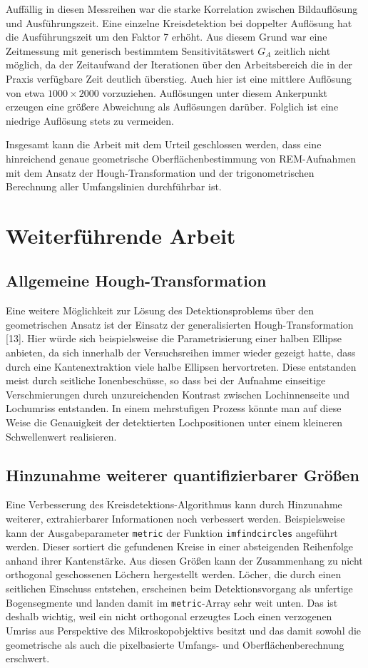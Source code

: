 \documentclass[accentcolor=tud1c, 11pt, toc=bib, toc=listof, captions=abovetable, parskip=half]{tudreport}
\begin{document}
Auffällig in diesen Messreihen war die starke Korrelation zwischen Bildauflösung und Ausführungszeit. Eine einzelne Kreisdetektion bei doppelter Auflösung hat die Ausführungszeit um den Faktor 7 erhöht. Aus diesem Grund war eine Zeitmessung mit generisch bestimmtem Sensitivitätswert $G_A$ zeitlich nicht möglich, da der Zeitaufwand der Iterationen über den Arbeitsbereich die in der Praxis verfügbare Zeit deutlich überstieg. 
Auch hier ist eine mittlere Auflösung von etwa $1000\times2000$ vorzuziehen. Auflösungen unter diesem Ankerpunkt erzeugen eine größere Abweichung als Auflösungen darüber. Folglich ist eine niedrige Auflösung stets zu vermeiden.

Insgesamt kann die Arbeit mit dem Urteil geschlossen werden, dass eine hinreichend genaue geometrische Oberflächenbestimmung von REM-Aufnahmen mit dem Ansatz der Hough-Transformation und der trigonometrischen Berechnung aller Umfangslinien durchführbar ist.

\chapter{Weiterführende Arbeit}
\section{Allgemeine Hough-Transformation}
Eine weitere Möglichkeit zur Lösung des Detektionsproblems über den geometrischen Ansatz ist der Einsatz der generalisierten Hough-Transformation [13]. Hier würde sich beispielsweise die Parametrisierung einer halben Ellipse anbieten, da sich innerhalb der Versuchsreihen immer wieder gezeigt hatte, dass durch eine Kantenextraktion viele halbe Ellipsen hervortreten. Diese entstanden meist durch seitliche Ionenbeschüsse, so dass bei der Aufnahme einseitige Verschmierungen durch unzureichenden Kontrast zwischen Lochinnenseite und Lochumriss entstanden. In einem mehrstufigen Prozess könnte man auf diese Weise die Genauigkeit der detektierten Lochpositionen unter einem kleineren Schwellenwert realisieren.

\section{Hinzunahme weiterer quantifizierbarer Größen}
Eine Verbesserung des Kreisdetektions-Algorithmus kann durch Hinzunahme weiterer, extrahierbarer Informationen noch verbessert werden. Beispielsweise kann der Ausgabeparameter \lstinline|metric| der Funktion \lstinline|imfindcircles| angeführt werden. Dieser sortiert die gefundenen Kreise in einer absteigenden Reihenfolge anhand ihrer Kantenstärke. Aus diesen Größen kann der Zusammenhang zu nicht orthogonal geschossenen Löchern hergestellt werden. Löcher, die durch einen seitlichen Einschuss entstehen, erscheinen beim Detektionsvorgang als unfertige Bogensegmente und landen damit im \lstinline|metric|-Array sehr weit unten. Das ist deshalb wichtig, weil ein nicht orthogonal erzeugtes Loch einen verzogenen Umriss aus Perspektive des Mikroskopobjektivs besitzt und das damit sowohl die geometrische als auch die pixelbasierte Umfangs- und Oberflächenberechnung erschwert.
\end{document}
